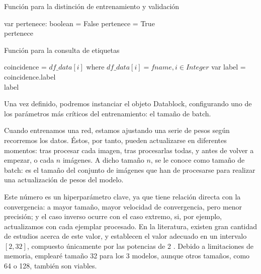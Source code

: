  \begin{algorithm}[H]
	\caption{Función para la distinción de entrenamiento y validación}
	\label{fig:particiones}
	\begin{algorithmic}[1]
		
		\State var pertenece: boolean = False
			\State pertenece = True
		\EndIf \\
		\Return pertenece
		\EndProcedure
		
	\end{algorithmic}
\end{algorithm}

\begin{algorithm}[H]
	\caption{Función para la consulta de etiquetas}
	\label{fig:etiquetadobinario}
	\begin{algorithmic}[1]
		
		\Procedure{ binary\_label}{fname, df\_data: Dataframe}
		\State coincidence = $df\_data[i]$ where $df\_data[i] = fname, i \in Integer$
		\State var label = coincidence.label\\
		\Return label
		\EndProcedure
		
	\end{algorithmic}
\end{algorithm}

Una vez definido, podremos instanciar el objeto Datablock, configurando uno de los parámetros más críticos del entrenamiento: el tamaño de batch.

Cuando entrenamos una red, estamos ajustando una serie de pesos según recorremos los datos. Éstos, por tanto, pueden actualizarse en diferentes momentos: tras procesar cada imagen, tras procesarlas todas, y antes de volver a empezar, o cada $n$ imágenes. A dicho tamaño $n$, se le conoce como tamaño de batch: es el tamaño del conjunto de imágenes que han de procesarse para realizar una actualización de pesos del modelo. 

Este número es un hiperparámetro clave, ya que tiene relación directa con la convergencia: a mayor tamaño, mayor velocidad de convergencia, pero menor precisión; y el caso inverso ocurre con el caso extremo, si, por ejemplo, actualizamos con cada ejemplar procesado. En la literatura, existen gran cantidad de estudios acerca de este valor, y establecen el valor adecuado en un intervalo $[2, 32]$,  compuesto únicamente por las potencias de 2  \cite{masters2018revisiting}. Debido a limitaciones de memoria, emplearé tamaño 32 para los 3 modelos, aunque otros tamaños, como 64 o 128, también son viables.

